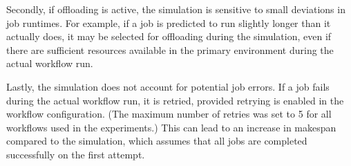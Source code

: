 Secondly, if offloading is active, the simulation is sensitive to small deviations in job runtimes. For example, if a job is predicted to run slightly longer than it actually does, it may be selected for offloading during the simulation, even if there are sufficient resources available in the primary environment during the actual workflow run. 

Lastly, the simulation does not account for potential job errors. If a job fails during the actual workflow run, it is retried, provided retrying is enabled in the workflow configuration. (The maximum number of retries was set to 5 for all workflows used in the experiments.) This can lead to an increase in makespan compared to the simulation, which assumes that all jobs are completed successfully on the first attempt. 


